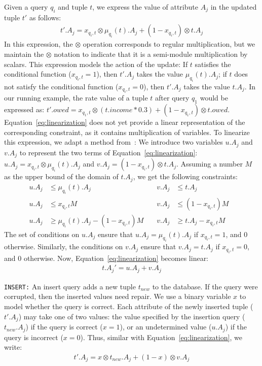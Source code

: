 Given a query $q_i$ and tuple $t$, we express the value of attribute $A_j$ in the updated tuple $t'$ as follows:
{\scriptsize
\begin{align}
\label{eq:linearization}
t'.A_j = x_{q_i, t}\otimes \mu_{q_i}(t).A_j + (1-x_{q_i, t})\otimes t.A_j 
\end{align} 
}
In this expression, the $\otimes$ operation corresponds to regular
multiplication, but we maintain the $\otimes$ notation to indicate
that it is a semi-module multiplication by scalars. This expression
models the action of the update: If $t$ satisfies the conditional
function ($x_{q_i, t}=1$), then $t'.A_j$ takes the value
$\mu_{q_i}(t).A_j$; if $t$ does not satisfy the conditional function
($x_{q_i, t}=0$), then $t'.A_j$ takes the value $t.A_j$.
In our running example, the rate value of a tuple $t$ after query $q_1$ would be expressed as:
$t'.owed = x_{q_1, t}\otimes (t.income*0.3) + (1-x_{q_1, t})\otimes t.owed$.
Equation~\eqref{eq:linearization} does not yet provide a linear
representation of the corresponding constraint, as it contains
multiplication of variables. To linearize this expression, we adapt a
method from~\cite{tiresias}: We introduce two variables $u.A_j$ and
$v.A_j$ to represent the two terms of
Equation~\eqref{eq:linearization}: $u.A_j=x_{q_i, t}\otimes
\mu_{q_i}(t).A_j$ and $v.A_j=(1-x_{q_i, t})\otimes t.A_j$. Assuming a
number $M$ as the upper bound of the domain of $t.A_j$, we get the
following constraints:
% 
{\scriptsize
\begin{align}
\label{eq:uv}
u.A_j &\leq \mu_{q_i}(t).A_j   &v.A_j &\leq t.A_j &\nonumber\\
u.A_j &\leq x_{q_i, t}M        &v.A_j &\leq (1-x_{q_i, t})M &\\
u.A_j &\geq \mu_{q_i}(t).A_j - (1-x_{q_i, t})M  \phantom{aa}
&v.A_j &\geq t.A_j - x_{q_i, t}M &\nonumber
\end{align}
}%
% 
The set of conditions on $u.A_j$ ensure that $u.A_j = \mu_{q_i}(t).A_j$ if $x_{q_i, t}=1$, and $0$ otherwise. Similarly, 
the conditions on $v.A_j$ ensure that $v.A_j = t.A_j$ if $x_{q_i, t}=0$, and $0$ otherwise.  
Now, Equation~\eqref{eq:linearization} becomes linear:
 {\scriptsize
\begin{align}
\label{eq:tnew}
t.A_j' = u.A_j + v.A_j
\end{align}
}

\vspace*{-0.1in}
\noindent\texttt{INSERT:}
An insert query adds a new tuple $t_{new}$ to the database.  If the query were 
corrupted, then the inserted values need repair. We use a binary variable $x$ to model whether the query is correct.  Each attribute of the newly inserted tuple ($t'.A_j$) may take one of two values: the value specified by the insertion query ($t_{new}.A_j$) if the query is correct ($x=1$), or an undetermined value ($u.A_j$) if the query is incorrect ($x=0$).  Thus, similar with Equation~\eqref{eq:linearization}, we write:
 {\scriptsize
\begin{eqnarray}
\label{eq:insert}
t'.A_j = x \otimes t_{new}.A_j + (1-x) \otimes v.A_j 
\end{eqnarray}
 }%


